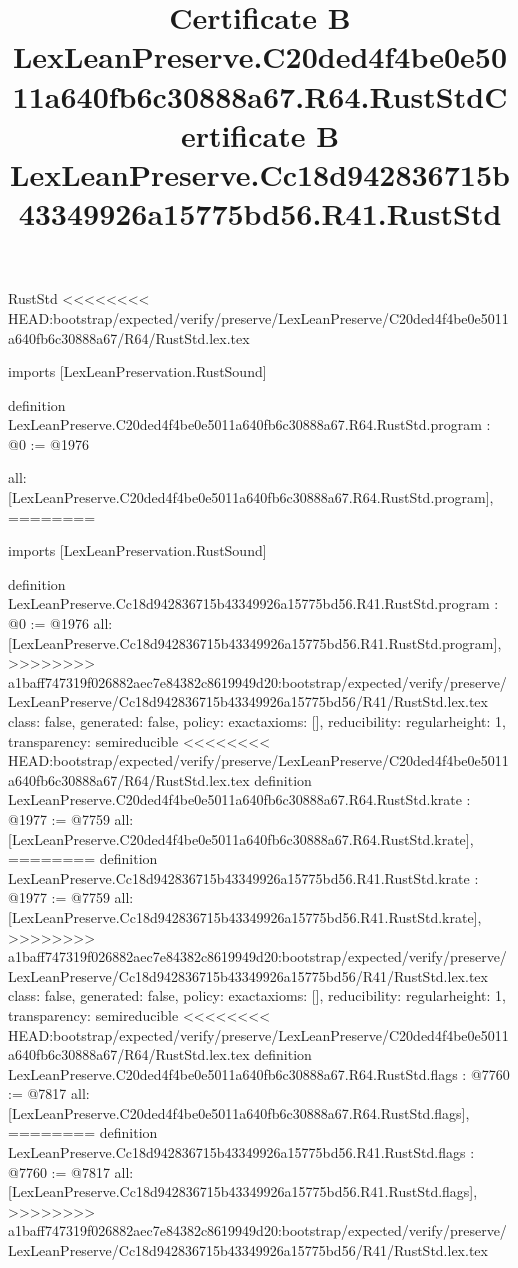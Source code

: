 \begin{lexlean}{RustStd}
<<<<<<<< HEAD:bootstrap/expected/verify/preserve/LexLeanPreserve/C20ded4f4be0e5011a640fb6c30888a67/R64/RustStd.lex.tex
\title{Certificate B LexLeanPreserve.C20ded4f4be0e5011a640fb6c30888a67.R64.RustStd}
\begin{coremodule}
imports [LexLeanPreservation.RustSound]

definition LexLeanPreserve.C20ded4f4be0e5011a640fb6c30888a67.R64.RustStd.program : @0 := @1976 {
  all: [LexLeanPreserve.C20ded4f4be0e5011a640fb6c30888a67.R64.RustStd.program],
========
\title{Certificate B LexLeanPreserve.Cc18d942836715b43349926a15775bd56.R41.RustStd}
\begin{coremodule}
imports [LexLeanPreservation.RustSound]

definition LexLeanPreserve.Cc18d942836715b43349926a15775bd56.R41.RustStd.program : @0 := @1976 {
  all: [LexLeanPreserve.Cc18d942836715b43349926a15775bd56.R41.RustStd.program],
>>>>>>>> a1baff747319f026882aec7e84382c8619949d20:bootstrap/expected/verify/preserve/LexLeanPreserve/Cc18d942836715b43349926a15775bd56/R41/RustStd.lex.tex
  class: false,
  generated: false,
  policy: exact{axioms: []},
  reducibility: regular{height: 1},
  transparency: semireducible
}
<<<<<<<< HEAD:bootstrap/expected/verify/preserve/LexLeanPreserve/C20ded4f4be0e5011a640fb6c30888a67/R64/RustStd.lex.tex
definition LexLeanPreserve.C20ded4f4be0e5011a640fb6c30888a67.R64.RustStd.krate : @1977 := @7759 {
  all: [LexLeanPreserve.C20ded4f4be0e5011a640fb6c30888a67.R64.RustStd.krate],
========
definition LexLeanPreserve.Cc18d942836715b43349926a15775bd56.R41.RustStd.krate : @1977 := @7759 {
  all: [LexLeanPreserve.Cc18d942836715b43349926a15775bd56.R41.RustStd.krate],
>>>>>>>> a1baff747319f026882aec7e84382c8619949d20:bootstrap/expected/verify/preserve/LexLeanPreserve/Cc18d942836715b43349926a15775bd56/R41/RustStd.lex.tex
  class: false,
  generated: false,
  policy: exact{axioms: []},
  reducibility: regular{height: 1},
  transparency: semireducible
}
<<<<<<<< HEAD:bootstrap/expected/verify/preserve/LexLeanPreserve/C20ded4f4be0e5011a640fb6c30888a67/R64/RustStd.lex.tex
definition LexLeanPreserve.C20ded4f4be0e5011a640fb6c30888a67.R64.RustStd.flags : @7760 := @7817 {
  all: [LexLeanPreserve.C20ded4f4be0e5011a640fb6c30888a67.R64.RustStd.flags],
========
definition LexLeanPreserve.Cc18d942836715b43349926a15775bd56.R41.RustStd.flags : @7760 := @7817 {
  all: [LexLeanPreserve.Cc18d942836715b43349926a15775bd56.R41.RustStd.flags],
>>>>>>>> a1baff747319f026882aec7e84382c8619949d20:bootstrap/expected/verify/preserve/LexLeanPreserve/Cc18d942836715b43349926a15775bd56/R41/RustStd.lex.tex
}}}
\end{coremodule}}
\end{coremodule}
\end{lexlean}
